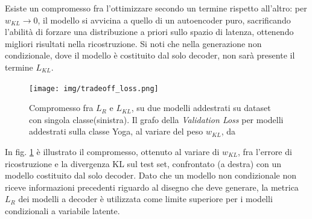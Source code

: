 Esiste un compromesso fra l'ottimizzare secondo un termine rispetto all'altro: per $w_{KL} \rightarrow 0$, il modello si avvicina a quello di un autoencoder puro, sacrificando l'abilità di forzare una distribuzione a priori sullo spazio di latenza, ottenendo migliori risultati nella ricostruzione. Si noti che nella generazione non condizionale, dove il modello è costituito dal solo decoder, non sarà presente il termine $L_{KL}$.
\begin{figure}
	\centering
	\texttt{[image: img/tradeoff\_loss.png]}
	\caption{Compromesso fra $L_R$ e $L_{KL}$, su due modelli addestrati su dataset con singola classe(sinistra). Il grafo della \textit{Validation Loss} per modelli addestrati sulla classe Yoga, al variare del peso $w_{KL}$, da \cite{sketchrnn}}
	\label{fig:1.19}
\end{figure}
In fig. \ref{fig:1.19} è illustrato il compromesso, ottenuto al variare di $w_{KL}$, fra l'errore di ricostruzione e la divergenza KL sul test set, confrontato (a destra) con un modello costituito dal solo decoder. Dato che un modello non condizionale non riceve informazioni precedenti riguardo al disegno che deve generare, la metrica $L_R$ dei modelli a decoder è utilizzata come limite superiore per i modelli condizionali a variabile latente.
